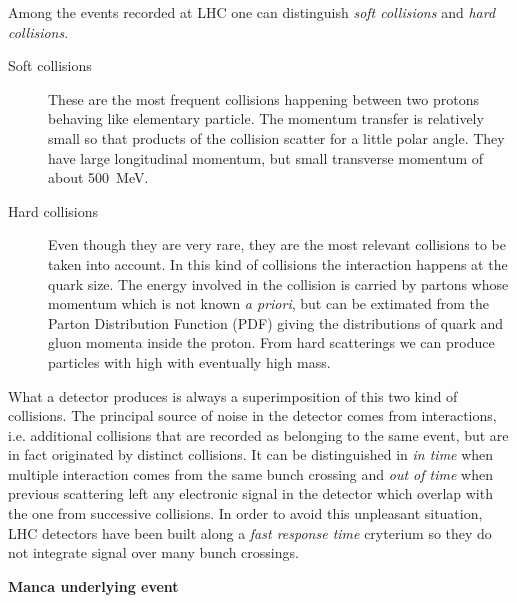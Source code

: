 Among the events recorded at LHC one can distinguish \emph{soft collisions} and \emph{hard collisions}.
\begin{description}
\item[Soft collisions] These are the most frequent collisions happening between two protons behaving like elementary particle. The momentum transfer is relatively small so that products of the collision scatter for a little polar angle. They have large longitudinal \mbox{momentum}, but small transverse momentum \pt of about \SI{500}{\MeV}.
\item[Hard collisions] Even though they are very rare, they are the most relevant collisions to be taken into account. In this kind of collisions the interaction happens at the quark size. The energy involved in the collision is carried by partons whose momentum which is not known \emph{a priori}, but can be extimated from the Parton Distribution Function (PDF) giving the distributions of quark and gluon momenta inside the proton. From hard scatterings we can produce particles with high \pt with eventually high mass.
\end{description}

What a detector produces is always a superimposition of this two kind of collisions. The principal source of noise in the detector comes from \pileup interactions, i.e. additional \pp collisions that are recorded as belonging to the same event, but are in fact originated by distinct collisions. It can be distinguished in \emph{in time \pileup} when multiple interaction comes from the same bunch crossing and \emph{out of time \pileup} when previous scattering left any electronic signal in the detector which overlap with the one from successive collisions. In order to avoid this unpleasant situation, LHC detectors have been built along a \emph{fast response time} cryterium so they do not integrate signal over many bunch crossings.

\textbf{Manca underlying event}

